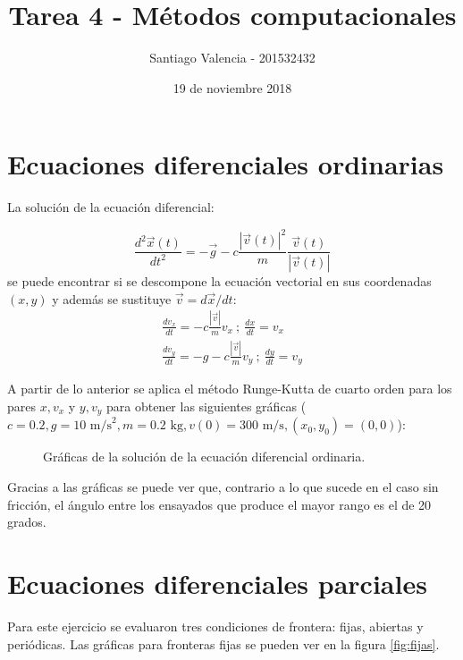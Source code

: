 \documentclass{article}
\title{Tarea 4 - Métodos computacionales}
\author{Santiago Valencia - 201532432}
\date{19 de noviembre 2018}
\begin{document}
\maketitle

\section*{Ecuaciones diferenciales ordinarias}

La solución de la ecuación diferencial:

\begin{equation*}
    \frac{d^2\vec{x}(t)}{dt^2} = -\vec{g} - c\frac{|\vec{v}(t)|^2}{m}\frac{\vec{v}(t)}{|\vec{v}(t)|}
\end{equation*}
se puede encontrar si se descompone la ecuación vectorial en sus coordenadas $(x, y)$ y además se sustituye $\vec{v} = d\vec{x}/dt$:
\begin{gather*}
    \frac{dv_x}{dt} = -c\frac{|\vec{v}|}{m}v_x \ ; \ \frac{dx}{dt} = v_x \\
    \frac{dv_y}{dt} = -g - c\frac{|\vec{v}|}{m}v_y \ ; \ \frac{dy}{dt} = v_y
\end{gather*}

A partir de lo anterior se aplica el método Runge-Kutta de cuarto orden para los pares $x, v_x$ y $y, v_y$ para obtener las siguientes gráficas ($c = 0.2, g = 10 \text{ m/s}^2, m = 0.2 \text{ kg}, v(0) = 300 \text{ m/s}, (x_0, y_0) = (0, 0)$):

\begin{figure}[h]
\centering
    \label{fig:ODEs}
    \caption{Gráficas de la solución de la ecuación diferencial ordinaria.}
\end{figure}

Gracias a las gráficas se puede ver que, contrario a lo que sucede en el caso sin fricción, el ángulo entre los ensayados que produce el mayor rango es el de 20 grados.


\section*{Ecuaciones diferenciales parciales}

Para este ejercicio se evaluaron tres condiciones de frontera: fijas, abiertas y periódicas. Las gráficas para fronteras fijas se pueden ver en la figura \ref{fig:fijas}.
\end{document}
